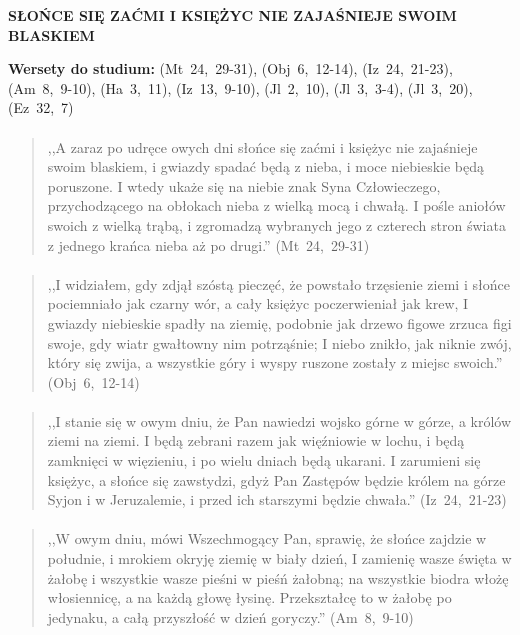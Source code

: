 \documentclass[10pt,a4paper,oneside]{article}
\begin{document}
\centerline{\textbf{\MakeUppercase{Słońce się zaćmi i księżyc nie zajaśnieje swoim blaskiem}}}
\begin{center}
\textbf{Wersety do studium:} 
\mbox{(Mt 24, 29-31)}, \mbox{(Obj 6, 12-14)}, \mbox{(Iz 24, 21-23)}, \mbox{(Am 8, 9-10)}, \mbox{(Ha 3, 11)}, \mbox{(Iz 13, 9-10)}, \mbox{(Jl 2, 10)}, \mbox{(Jl 3, 3-4)}, \mbox{(Jl 3, 20)}, \mbox{(Ez 32, 7)}
\end{center}
\paragraph{}
\begin{quote}
,,A zaraz po udręce owych dni słońce się zaćmi i księżyc nie zajaśnieje swoim blaskiem, i gwiazdy spadać będą z nieba, i moce niebieskie będą poruszone. I wtedy ukaże się na niebie znak Syna Człowieczego, przychodzącego na obłokach nieba z wielką mocą i chwałą. I pośle aniołów swoich z wielką trąbą, i zgromadzą wybranych jego z czterech stron świata z jednego krańca nieba aż po drugi.'' \mbox{(Mt 24, 29-31)}
\end{quote}
\paragraph{}
\begin{quote}
,,I widziałem, gdy zdjął szóstą pieczęć, że powstało trzęsienie ziemi i słońce pociemniało jak czarny wór, a cały księżyc poczerwieniał jak krew, I gwiazdy niebieskie spadły na ziemię, podobnie jak drzewo figowe zrzuca figi swoje, gdy wiatr gwałtowny nim potrząśnie; I niebo znikło, jak niknie zwój, który się zwija, a wszystkie góry i wyspy ruszone zostały z miejsc swoich.'' \mbox{(Obj 6, 12-14)}
\end{quote}
\paragraph{}
\begin{quote}
,,I stanie się w owym dniu, że Pan nawiedzi wojsko górne w górze, a królów ziemi na ziemi. I będą zebrani razem jak więźniowie w lochu, i będą zamknięci w więzieniu, i po wielu dniach będą ukarani. I zarumieni się księżyc, a słońce się zawstydzi, gdyż Pan Zastępów będzie królem na górze Syjon i w Jeruzalemie, i przed ich starszymi będzie chwała.'' \mbox{(Iz 24, 21-23)}
\end{quote}
\paragraph{}
\begin{quote}
,,W owym dniu, mówi Wszechmogący Pan, sprawię, że słońce zajdzie w południe, i mrokiem okryję ziemię w biały dzień, I zamienię wasze święta w żałobę i wszystkie wasze pieśni w pieśń żałobną; na wszystkie biodra włożę włosiennicę, a na każdą głowę łysinę. Przekształcę to w żałobę po jedynaku, a całą przyszłość w dzień goryczy.'' \mbox{(Am 8, 9-10)}
\end{quote}
\end{document}
